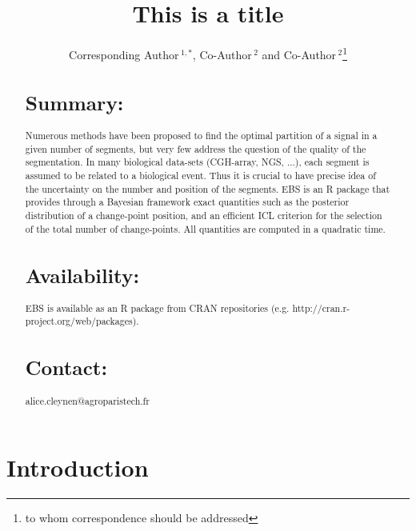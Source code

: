 \documentclass{bioinfo}
\begin{document}

\title[short Title]{This is a title}
\author[Sample \textit{et~al}]{Corresponding Author\,$^{1,*}$, Co-Author\,$^{2}$ and Co-Author\,$^2$\footnote{to whom correspondence should be addressed}}
\address{$^{1}$Department of XXXXXXX, Address XXXX etc.\\
$^{2}$Department of XXXXXXXX, Address XXXX etc.}



\maketitle


\begin{abstract}

\section{Summary:}
 Numerous methods have been proposed to find the optimal partition of a signal in a given number of segments, but very few address the question of the quality of the segmentation. In many biological data-sets (CGH-array, NGS, ...),  each segment is assumed to be related to a biological event. Thus it is crucial to have precise idea of the uncertainty on the number and position of the segments.
EBS is an R package that provides through a Bayesian framework exact quantities such as the posterior distribution of a change-point position, and an efficient ICL criterion for the selection of the total number of change-points. All quantities are computed in a quadratic time.


\section{Availability:}
EBS is available as an R package from CRAN repositories (e.g. http://cran.r-project.org/web/packages).


\section{Contact:} alice.cleynen@agroparistech.fr
\end{abstract}


\section{Introduction}
\end{document}
